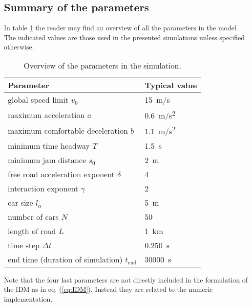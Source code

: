 \subsection{Summary of the parameters}
In table \ref{tab:param} the reader may find an overview of all the parameters in the model. The indicated values are those used in the presented simulations unless specified otherwise.
\begin{table}
    \begin{center}
        \begin{tabular}[pos]{p{} p{}}
            \toprule
            Parameter & Typical value\\
            \midrule
            global speed limit $v_0$ & \SI{15}{m/s} \\
            maximum acceleration $a$ & \SI{0.6}{m/s^2} \\
            maximum comfortable deceleration $b$ & \SI{1.1}{m/s^2} \\
            minimum time headway $T$ & \SI{1.5}{s} \\
            minimum jam distance $s_0$ & \SI{2}{m} \\
            free road acceleration exponent $\delta$ & 4 \\
            interaction exponent $\gamma$ & 2\\
            car size $l_\alpha$ & \SI{5}{m} \\
            number of cars $N$ & 50\\
            length of road $L$ & \SI{1}{km} \\
            time step $\Delta t$ & \SI{0.250}{s} \\
            end time (duration of simulation) $t_\mathrm{end}$ &  \SI{30000}{s}\\
            \bottomrule
        \end{tabular}
    \end{center}
    \caption{Overview of the parameters in the simulation.}
    \label{tab:param}
\end{table}


Note that the four last parameters are not directly included in the formulation of the IDM as in eq. (\ref{eq:IDM}). Instead they are related to the numeric implementation.
